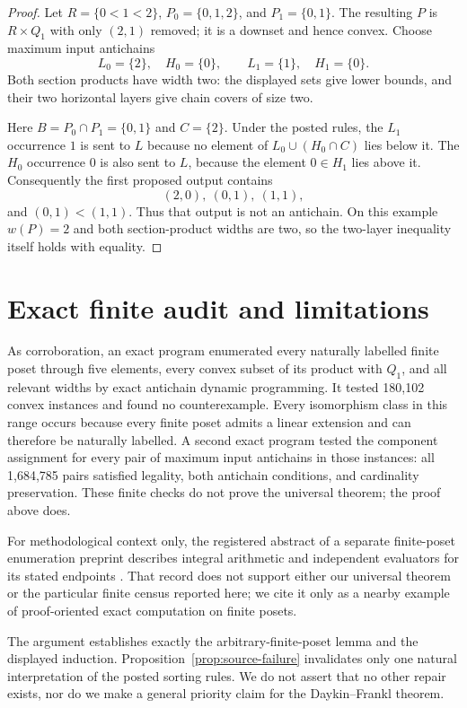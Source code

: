 \documentclass[11pt]{article}
\newcommand{\Q}{Q}
\begin{document}
\begin{proof}
Let $R=\{0<1<2\}$, $P_0=\{0,1,2\}$, and $P_1=\{0,1\}$.  The resulting
$P$ is $R\times\Q_1$ with only $(2,1)$ removed; it is a downset and hence
convex.  Choose maximum input antichains
\[
 L_0=\{2\},\quad H_0=\{0\},\qquad
 L_1=\{1\},\quad H_1=\{0\}.
\]
Both section products have width two: the displayed sets give lower bounds,
and their two horizontal layers give chain covers of size two.

Here $B=P_0\cap P_1=\{0,1\}$ and $C=\{2\}$.  Under the posted rules, the
$L_1$ occurrence $1$ is sent to $L$ because no element of
$L_0\cup(H_0\cap C)$ lies below it.  The $H_0$ occurrence $0$ is also sent
to $L$, because the element $0\in H_1$ lies above it.  Consequently the
first proposed output contains
\[
 (2,0),\ (0,1),\ (1,1),
\]
and $(0,1)<(1,1)$.  Thus that output is not an antichain.  On this example
$w(P)=2$ and both section-product widths are two, so the two-layer inequality
itself holds with equality.
\end{proof}

\section{Exact finite audit and limitations}

As corroboration, an exact program enumerated every naturally labelled
finite poset through five elements, every convex subset of its product with
$\Q_1$, and all relevant widths by exact antichain dynamic programming.  It
tested 180,102 convex instances and found no counterexample.  Every
isomorphism class in this range occurs because every finite poset admits a
linear extension and can therefore be naturally labelled.  A second exact
program tested the component assignment for every pair of maximum input
antichains in those instances: all 1,684,785 pairs satisfied legality, both
antichain conditions, and cardinality preservation.  These finite checks do
not prove the universal theorem; the proof above does.

For methodological context only, the registered abstract of a separate
finite-poset enumeration preprint describes integral arithmetic and independent
evaluators for its stated endpoints \cite{Zeng2026SSRN7385118}.  That record
does not support either our universal theorem or the particular finite census
reported here; we cite it only as a nearby example of proof-oriented exact
computation on finite posets.

The argument establishes exactly the arbitrary-finite-poset lemma and the
displayed induction.  Proposition~\ref{prop:source-failure} invalidates only
one natural interpretation of the posted sorting rules.  We do not assert
that no other repair exists, nor do we make a general priority claim for the
Daykin--Frankl theorem.
\end{document}
